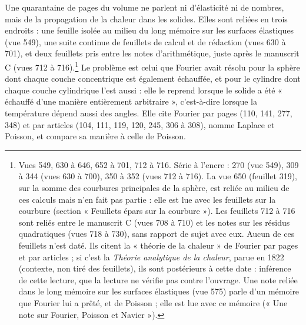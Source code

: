 \documentclass[11pt,a4paper]{article}
\begin{document}
Une quarantaine de pages du volume ne parlent ni d'élasticité ni de nombres,
mais de la propagation de la chaleur dans les solides. Elles sont reliées en
trois endroits : une feuille isolée au milieu du long mémoire sur les surfaces
élastiques (vue 549), une suite continue de feuillets de calcul et de rédaction
(vues 630 à 701), et deux feuillets pris entre les notes d'arithmétique, juste
après le manuscrit C (vues 712 à 716).\footnote{Vues 549, 630 à 646, 652 à
701, 712 à 716. Série à l'encre : 270 (vue 549), 309 à 344 (vues 630 à 700),
350 à 352 (vues 712 à 716). La vue 650 (feuillet 319), sur la somme des
courbures principales de la sphère, est reliée au milieu de ces calculs mais
n'en fait pas partie : elle est lue avec les feuillets sur la courbure
(section « Feuillets épars sur la courbure »). Les feuillets 712 à 716 sont
reliés entre le manuscrit C (vues 708 à 710) et les notes sur les résidus
quadratiques (vues 718 à 730), sans rapport de sujet avec eux. Aucun de ces
feuillets n'est daté. Ils citent la « théorie de la chaleur » de Fourier par
pages et par articles ; si c'est la \emph{Théorie analytique de la chaleur},
parue en 1822 (contexte, non tiré des feuillets), ils sont postérieurs à cette
date : inférence de cette lecture, que la lecture ne vérifie pas contre
l'ouvrage. Une note reliée dans le long mémoire sur les surfaces élastiques
(vue 575) parle d'un mémoire que Fourier lui a prêté, et de Poisson ; elle est
lue avec ce mémoire (« Une note sur Fourier, Poisson et Navier »).} Le problème est celui que Fourier avait résolu pour la sphère dont
chaque couche concentrique est également échauffée, et pour le cylindre dont
chaque couche cylindrique l'est aussi : elle le reprend lorsque le solide a
été « échauffé d'une manière entièrement arbitraire », c'est-à-dire lorsque la
température dépend aussi des angles. Elle cite Fourier par pages (110, 141,
277, 348) et par articles (104, 111, 119, 120, 245, 306 à 308), nomme Laplace
et Poisson, et compare sa manière à celle de Poisson.
\end{document}
